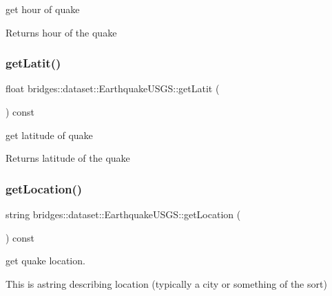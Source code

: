 get hour of quake 

\begin{DoxyReturn}{Returns}
hour of the quake 
\end{DoxyReturn}
\mbox{\label{classbridges_1_1dataset_1_1_earthquake_u_s_g_s_aea3eca11487e572ead2ed91197d3d387}} 
\subsubsection{\texorpdfstring{get\+Latit()}{getLatit()}}
{\footnotesize\ttfamily float bridges\+::dataset\+::\+Earthquake\+U\+S\+G\+S\+::get\+Latit (\begin{DoxyParamCaption}{ }\end{DoxyParamCaption}) const\hspace{0.3cm}{\ttfamily [inline]}}



get latitude of quake 

\begin{DoxyReturn}{Returns}
latitude of the quake 
\end{DoxyReturn}
\mbox{\label{classbridges_1_1dataset_1_1_earthquake_u_s_g_s_a56f3fede61e32b4bc35874435c59fc0e}} 
\subsubsection{\texorpdfstring{get\+Location()}{getLocation()}}
{\footnotesize\ttfamily string bridges\+::dataset\+::\+Earthquake\+U\+S\+G\+S\+::get\+Location (\begin{DoxyParamCaption}{ }\end{DoxyParamCaption}) const\hspace{0.3cm}{\ttfamily [inline]}}



get quake location. 

This is astring describing location (typically a city or something of the sort)

